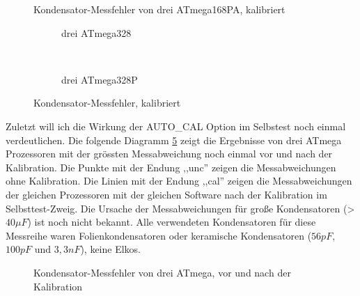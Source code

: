 \begin{figure}[H]
\centering

\caption{Kondensator-Messfehler von drei ATmega168PA, kalibriert}
\label{fig:mega168PAcal}
\end{figure}

\begin{figure}[H]
  \begin{subfigure}[b]{9cm}
    \centering
    \resizebox{9cm}{!}{}
    \caption{drei ATmega328}
    \label{fig:mega328cal}
  \end{subfigure}
  ~
  \begin{subfigure}[b]{9cm}
    \centering
    \resizebox{9cm}{!}{}
    \caption{drei ATmega328P}
    \label{fig:mega328Pcal}
  \end{subfigure}
  \caption{Kondensator-Messfehler, kalibriert}
\end{figure}

Zuletzt will ich die Wirkung der AUTO\_CAL Option im Selbstest noch einmal verdeutlichen.
Die folgende Diagramm \ref{fig:MegaAuto} zeigt die Ergebnisse von drei ATmega Prozessoren 
mit der grössten Messabweichung noch einmal vor und nach der Kalibration.
Die Punkte mit der Endung ,,unc'' zeigen die Messabweichungen ohne Kalibration.
Die Linien mit der Endung ,,cal'' zeigen die Messabweichungen der gleichen Prozessoren
mit der gleichen Software nach der Kalibration im Selbsttest-Zweig.
Die Ursache der Messabweichungen für große Kondensatoren (\textgreater\(40 \mu F\)) ist
noch nicht bekannt. Alle verwendeten Kondensatoren für diese Messreihe waren
Folienkondensatoren oder keramische Kondensatoren (\(56 pF\), \(100 pF\) und \(3,3 nF\)), keine Elkos.

\begin{figure}[H]
\centering

\caption{Kondensator-Messfehler von drei ATmega, vor und nach der Kalibration}
\label{fig:MegaAuto}
\end{figure}
